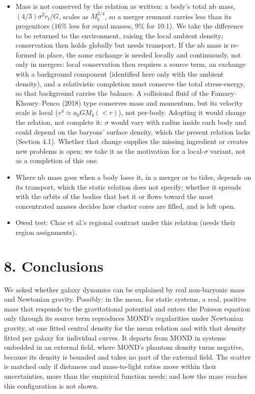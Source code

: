 \documentclass[
  10pt,
]{article}
\begin{document}
\begin{itemize}
\item Mass is not conserved by the relation as written: a body's total nb mass, $(4/3)\sigma^2r_t/G$, scales as $M_b^{3/4}$, so a merger remnant carries less than its progenitors (16\% less for equal masses, 9\% for 10:1). We take the difference to be returned to the environment, raising the local ambient density; conservation then holds globally but needs transport. If the nb mass is re-formed in place, the same exchange is needed locally and continuously, not only in mergers: local conservation then requires a source term, an exchange with a background component (identified here only with the ambient density), and a relativistic completion must conserve the total stress-energy, so that background carries the balance. A collisional fluid of the Famaey--Khoury--Penco (2018) type conserves mass and momentum, but its velocity scale is local ($v^4\approx a_0GM_b(<r)$), not per-body. Adopting it would change the relation, not complete it: $\sigma$ would vary with radius inside each body and could depend on the baryons' surface density, which the present relation lacks (Section 4.1). Whether that change supplies the missing ingredient or creates new problems is open; we take it as the motivation for a local-$\sigma$ variant, not as a completion of this one.
\item Where nb mass goes when a body loses it, in a merger or to tides, depends on its transport, which the static relation does not specify; whether it spreads with the orbits of the bodies that lost it or flows toward the most concentrated masses decides how cluster cores are filled, and is left open.
\item Owed test: Chae et al.'s regional contrast under this relation (needs their region assignments).
\end{itemize}


\section{8. Conclusions}\label{conclusions}

We asked whether galaxy dynamics can be explained by real non-baryonic mass and Newtonian gravity. Possibly: in the mean, for static systems, a real, positive mass that responds to the gravitational potential and enters the Poisson equation only through its source term reproduces MOND's regularities under Newtonian gravity, at one fitted central density for the mean relation and with that density fitted per galaxy for individual curves. It departs from MOND in systems embedded in an external field, where MOND's phantom density turns negative, because its density is bounded and takes no part of the external field. The scatter is matched only if distances and mass-to-light ratios move within their uncertainties, more than the empirical function needs; and how the mass reaches this configuration is not shown.
\end{document}
